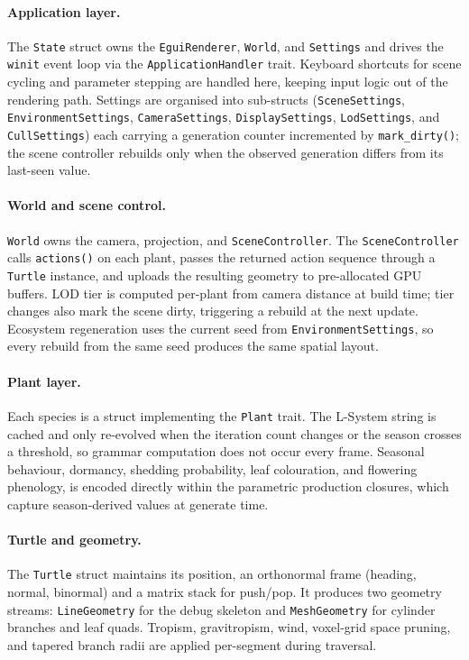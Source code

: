 \paragraph{Application layer.}
The \texttt{State} struct owns the \texttt{EguiRenderer}, \texttt{World}, and \texttt{Settings} and drives
the \texttt{winit} event loop via the \texttt{ApplicationHandler} trait. Keyboard shortcuts for scene cycling
and parameter stepping are handled here, keeping input logic out of the rendering path. Settings are
organised into sub-structs (\texttt{SceneSettings}, \texttt{EnvironmentSettings}, \texttt{CameraSettings},
\texttt{DisplaySettings}, \texttt{LodSettings}, and \texttt{CullSettings}) each carrying a generation counter
incremented by \texttt{mark\_dirty()}; the scene controller rebuilds only when the observed generation
differs from its last-seen value.

\paragraph{World and scene control.}
\texttt{World} owns the camera, projection, and \texttt{SceneController}. The \texttt{SceneController} calls
\texttt{actions()} on each plant, passes the returned action sequence through a \texttt{Turtle} instance, and
uploads the resulting geometry to pre-allocated GPU buffers. LOD tier is computed per-plant from camera
distance at build time; tier changes also mark the scene dirty, triggering a rebuild at the next update.
Ecosystem regeneration uses the current seed from \texttt{EnvironmentSettings}, so every rebuild from the
same seed produces the same spatial layout.

\paragraph{Plant layer.}
Each species is a struct implementing the \texttt{Plant} trait. The L-System string is cached and only
re-evolved when the iteration count changes or the season crosses a threshold, so grammar computation does
not occur every frame. Seasonal behaviour, dormancy, shedding probability, leaf colouration, and flowering
phenology, is encoded directly within the parametric production closures, which capture season-derived values
at generate time.

\paragraph{Turtle and geometry.}
The \texttt{Turtle} struct maintains its position, an orthonormal frame (heading, normal, binormal) and a
matrix stack for push/pop. It produces two geometry streams: \texttt{LineGeometry} for the debug skeleton and
\texttt{MeshGeometry} for cylinder branches and leaf quads. Tropism, gravitropism, wind, voxel-grid space
pruning, and tapered branch radii are applied per-segment during traversal.

